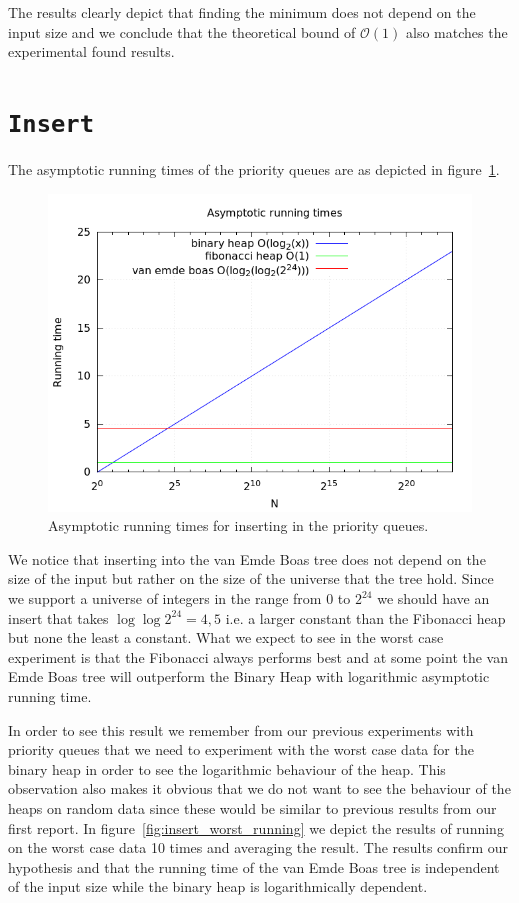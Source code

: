 \documentclass[a4paper,oneside,article,11pt]{memoir}
\begin{document}
The results clearly depict that finding the minimum does not depend on the input size and we conclude that the theoretical bound of $\mathcal{O}(1)$ also matches the experimental found results.

\section{\texttt{Insert}}
The asymptotic running times of the priority queues are as depicted in figure~\ref{fig:asymptotic_insert}.

\begin{figure}[H]
\includegraphics[scale=0.5]{../res2/inserts/runtime_plot.png}
\caption{Asymptotic running times for inserting in the priority queues.}
\label{fig:asymptotic_insert}
\end{figure}

We notice that inserting into the van Emde Boas tree does not depend on the size of the input but rather on the size of the universe that the tree hold. Since we support a universe of integers in the range from $0$ to $2^{24}$ we should have an insert that takes $\log\log 2^{24} = 4,5$ i.e. a larger constant than the Fibonacci heap but none the least a constant. What we expect to see in the worst case experiment is that the Fibonacci always performs best and at some point the van Emde Boas tree will outperform the Binary Heap with logarithmic asymptotic running time.

In order to see this result we remember from our previous experiments with priority queues that we need to experiment with the worst case data for the binary heap in order to see the logarithmic behaviour of the heap. This observation also makes it obvious that we do not want to see the behaviour of the heaps on random data since these would be similar to previous results from our first report. In figure~\ref{fig:insert_worst_running} we depict the results of running on the worst case data 10 times and averaging the result. The results confirm our hypothesis and that the running time of the van Emde Boas tree is independent of the input size while the binary heap is logarithmically dependent.
\end{document}
